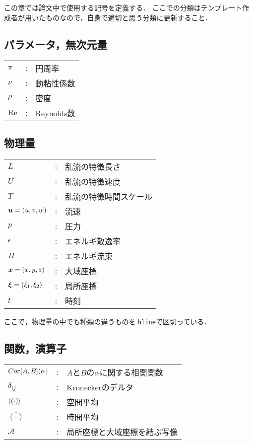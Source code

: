 \chapter*{\tosname}

\begin{tcolorbox}
  この章では論文中で使用する記号を定義する．
  ここでの分類はテンプレート作成者が用いたものなので，自身で適切と思う分類に更新すること．
\end{tcolorbox}

\section*{パラメータ，無次元量}
\begin{tabular}{lll}
\(\pi\)  & : & 円周率 \\
\(\nu\)  & : & 動粘性係数 \\
\(\rho\) & : & 密度 \\
\(\mathrm{Re}\) & : & Reynolds数
\end{tabular}

\section*{物理量}
\begin{tabular}{lll}
\(L\) & : & 乱流の特徴長さ \\
\(U\) & : & 乱流の特徴速度 \\
\(T\) & : & 乱流の特徴時間スケール \\ \hline
\(\vb*{u}=(u,v,w)\)  & : & 流速 \\
\(p\) & : & 圧力 \\
\(\epsilon\) & : & エネルギ散逸率 \\
\(\varPi\) & : & エネルギ流束 \\ \hline
\(\vb*{x}=(x,y,z)\) & : & 大域座標 \\
\(\vb*{\xi}=(\xi_1,\xi_2)\) & : & 局所座標 \\
\(t\) & : & 時刻
\end{tabular}

\begin{tcolorbox}
  ここで，物理量の中でも種類の違うものを \texttt{hline}で区切っている．
\end{tcolorbox}

\section*{関数，演算子}
\begin{tabular}{lll}
\(Cor\qty[A,B]\qty(\alpha)\) & : & \(A\)と\(B\)の\(\alpha\)に関する相関関数 \\
\(\delta_{ij}\) & : & Kroneckerのデルタ \\
\(\expval{(\cdot)}\) & : & 空間平均 \\
\(\overline{(\cdot)}\) & : & 時間平均 \\
\(\mathcal{A}\) & : & 局所座標と大域座標を結ぶ写像
\end{tabular}

